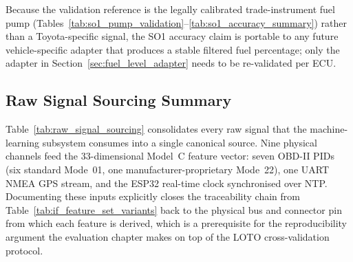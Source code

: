 Because the validation reference is the legally calibrated trade-instrument fuel pump (Tables~\ref{tab:so1_pump_validation}--\ref{tab:so1_accuracy_summary}) rather than a Toyota-specific signal, the SO1 accuracy claim is portable to any future vehicle-specific adapter that produces a stable filtered fuel percentage; only the adapter in Section~\ref{sec:fuel_level_adapter} needs to be re-validated per ECU.

\subsection{Raw Signal Sourcing Summary}
\label{sec:raw_signal_sourcing}

Table~\ref{tab:raw_signal_sourcing} consolidates every raw signal that the machine-learning subsystem consumes into a single canonical source. Nine physical channels feed the 33-dimensional Model~C feature vector: seven OBD-II PIDs (six standard Mode~01, one manufacturer-proprietary Mode~22), one UART NMEA GPS stream, and the ESP32 real-time clock synchronised over NTP. Documenting these inputs explicitly closes the traceability chain from Table~\ref{tab:if_feature_set_variants} back to the physical bus and connector pin from which each feature is derived, which is a prerequisite for the reproducibility argument the evaluation chapter makes on top of the LOTO cross-validation protocol.

